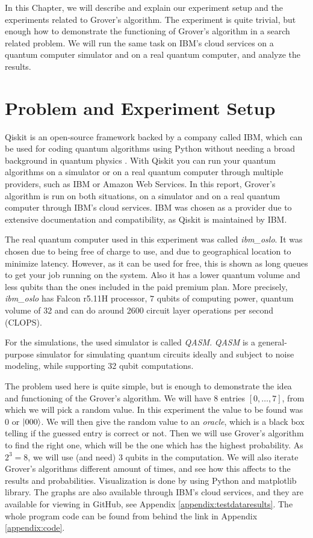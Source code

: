 \documentclass[english,oneside,openright]{UH_DS_report}
\begin{document}
In this Chapter, we will describe and explain our experiment setup and the experiments related to Grover's algorithm. The experiment is quite trivial, but enough how to demonstrate the functioning of Grover's algorithm in a search related problem. We will run the same task on IBM's cloud services on a quantum computer simulator and on a real quantum computer, and analyze the results.

\section{Problem and Experiment Setup}
Qiskit is an open-source framework backed by a company called IBM, which can be used for coding quantum algorithms using Python without needing a broad background in quantum physics \cite{https://doi.org/10.48550/arxiv.1903.04359}. With Qiskit you can run your quantum algorithms on a simulator or on a real quantum computer through multiple providers, such as IBM or Amazon Web Services. In this report, Grover's algorithm is run on both situations, on a simulator and on a real quantum computer through IBM's cloud services. IBM was chosen as a provider due to extensive documentation and compatibility, as Qiskit is maintained by IBM.

The real quantum computer used in this experiment was called \emph{ibm\_oslo}. It was chosen due to being free of charge to use, and due to geographical location to minimize latency. However, as it can be used for free, this is shown as long queues to get your job running on the system. Also it has a lower quantum volume and less qubits than the ones included in the paid premium plan. More precisely, \emph{ibm\_oslo} has Falcon r5.11H processor, $7$ qubits of computing power, quantum volume of 32 and can do around 2600 circuit layer operations per second (CLOPS).

For the simulations, the used simulator is called \emph{QASM}. \emph{QASM} is a general-purpose simulator for simulating quantum circuits ideally and subject to noise modeling, while supporting 32 qubit computations.

The problem used here is quite simple, but is enough to demonstrate the idea and functioning of the Grover's algorithm. We will have 8 entries $[0, \ldots, 7]$, from which we will pick a random value. In this experiment the value to be found was $0$ or $\ket{000}$. We will then give the random value to an \emph{oracle}, which is a black box telling if the guessed entry is correct or not. Then we will use Grover's algorithm to find the right one, which will be the one which has the highest probability. As $2^{3}=8$, we will use (and need) $3$ qubits in the computation. We will also iterate Grover's algorithms different amount of times, and see how this affects to the results and probabilities. Visualization is done by using Python and matplotlib library. The graphs are also available through IBM's cloud services, and they are available for viewing in GitHub, see Appendix \ref{appendix:testdataresults}. The whole program code can be found from behind the link in Appendix \ref{appendix:code}.
\end{document}
